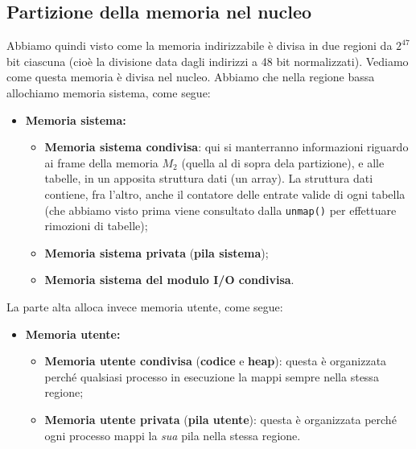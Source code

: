 \documentclass[a4paper,11pt]{article}
\begin{document}
\subsection{Partizione della memoria nel nucleo}
Abbiamo quindi visto come la memoria indirizzabile è divisa in due regioni da $2^{47}$ bit ciascuna (cioè la divisione data dagli indirizzi a 48 bit normalizzati).
Vediamo come questa memoria è divisa nel nucleo.
Abbiamo che nella regione bassa allochiamo memoria sistema, come segue:
\begin{itemize}
	\item \textbf{Memoria sistema:}
		\begin{itemize}
			\item \textbf{Memoria sistema condivisa}: qui si manterranno informazioni riguardo ai frame della memoria $M_2$ (quella al di sopra dela partizione), e alle tabelle, in un apposita struttura dati (un array).
La struttura dati contiene, fra l'altro, anche il contatore delle entrate valide di ogni tabella (che abbiamo visto prima viene consultato dalla \lstinline|unmap()| per effettuare rimozioni di tabelle);
	
\item \textbf{Memoria sistema privata} (\textbf{pila sistema});
\item \textbf{Memoria sistema del modulo I/O condivisa}.
		\end{itemize}
\end{itemize}

La parte alta alloca invece memoria utente, come segue:
\begin{itemize}
	\item \textbf{Memoria utente:}
		\begin{itemize}
			\item \textbf{Memoria utente condivisa} (\textbf{codice} e \textbf{heap}): questa è organizzata perché qualsiasi processo in esecuzione la mappi sempre nella stessa regione;
			\item \textbf{Memoria utente privata} (\textbf{pila utente}): questa è organizzata perché ogni processo mappi la \textit{sua} pila nella stessa regione.
		\end{itemize}
\end{itemize}
\end{document}
